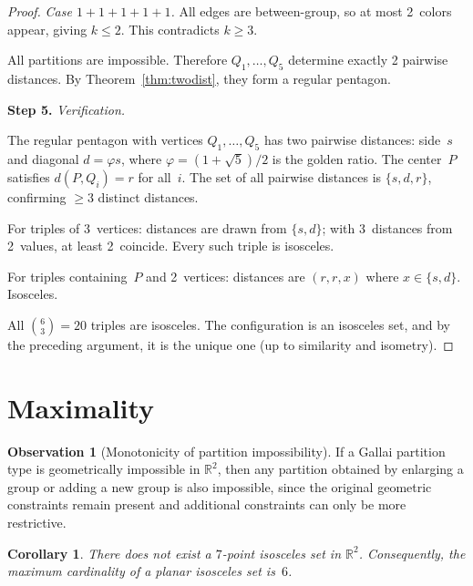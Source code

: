 \documentclass[12pt]{amsart}
\newtheorem{corollary}[theorem]{Corollary}
\theoremstyle{definition}
\newtheorem{observation}[theorem]{Observation}
\begin{document}
\begin{proof}
\smallskip
\emph{Case $1+1+1+1+1$.} All edges are between-group, so at most 2~colors appear, giving $k \leq 2$. This contradicts $k \geq 3$.

\smallskip
All partitions are impossible. Therefore $Q_1, \ldots, Q_5$ determine exactly 2 pairwise distances. By Theorem~\ref{thm:twodist}, they form a regular pentagon.

\medskip
\noindent\textbf{Step 5.} \emph{Verification.}

\smallskip
The regular pentagon with vertices $Q_1, \ldots, Q_5$ has two pairwise distances: side~$s$ and diagonal $d = \varphi s$, where $\varphi = (1+\sqrt{5})/2$ is the golden ratio. The center~$P$ satisfies $d(P, Q_i) = r$ for all~$i$. The set of all pairwise distances is $\{s, d, r\}$, confirming $\geq 3$ distinct distances.

For triples of 3~vertices: distances are drawn from $\{s, d\}$; with 3~distances from 2~values, at least 2~coincide. Every such triple is isosceles.

For triples containing~$P$ and 2~vertices: distances are $(r, r, x)$ where $x \in \{s, d\}$. Isosceles.

All $\binom{6}{3} = 20$ triples are isosceles. The configuration is an isosceles set, and by the preceding argument, it is the unique one (up to similarity and isometry).
\end{proof}

\section{Maximality}

\begin{observation}[Monotonicity of partition impossibility]\label{obs:mono}
If a Gallai partition type is geometrically impossible in\/ $\mathbb{R}^2$, then any partition obtained by enlarging a group or adding a new group is also impossible, since the original geometric constraints remain present and additional constraints can only be more restrictive.
\end{observation}

\begin{corollary}\label{cor:max6}
There does not exist a $7$-point isosceles set in\/ $\mathbb{R}^2$. Consequently, the maximum cardinality of a planar isosceles set is~$6$.
\end{corollary}
\end{document}
